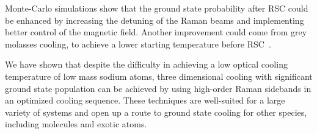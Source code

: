 {  Monte-Carlo simulations show that the ground state probability after RSC
  could be enhanced by increasing the detuning of the Raman beams and implementing
  better control of the magnetic field. Another improvement could come from
  grey molasses cooling, to achieve a lower starting temperature before RSC~\cite{Colzi2016}.

  We have shown that despite the difficulty in achieving a low optical cooling temperature
  of low mass sodium atoms, three dimensional cooling
  with significant ground state population can be achieved by using high-order Raman sidebands
  in an optimized cooling sequence.
  These techniques are well-suited for a large variety of systems
  and open up a route to ground state cooling for other species,
  including molecules and exotic atoms.
}

